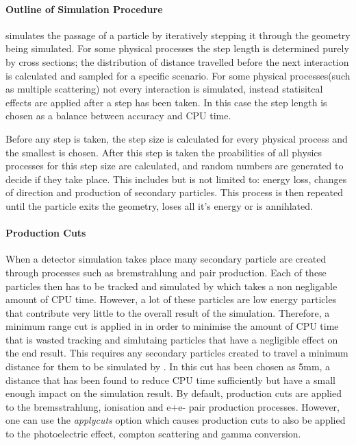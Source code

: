 \paragraph{Outline of \geant Simulation Procedure} \label{sec:steps}
\geant simulates the passage of a particle by iteratively stepping it through the geometry being simulated.  For some physical processes the step length is determined purely by cross sections; the distribution of distance travelled before the next interaction is calculated and sampled for a specific scenario.  For some physical processes(such as multiple scattering) not every interaction is simulated, instead statisitcal effects are applied after a step has been taken.  In this case the step length is chosen as a balance between accuracy and CPU time.

Before any step is taken, the step size is calculated for every physical process and the smallest is chosen.  After this step is taken the proabilities of all physics processes for this step size are calculated, and random numbers are generated to decide if they take place.  This includes but is not limited to: energy loss, changes of direction and production of secondary particles.  This process is then repeated until the particle exits the geometry, loses all it's energy or is annihlated.

\paragraph{Production Cuts}\label{sec:products}When a detector simulation takes place many secondary particle are created through processes such as bremstrahlung and pair production.  Each of these particles then has to be tracked and simulated by \geant which takes a non negligable amount of CPU time. However, a lot of these particles are low energy particles that contribute very little to the overall result of the simulation.  Therefore, a minimum range cut is applied in \geant in order to minimise the amount of CPU time that is wasted tracking and simlutaing particles that have a negligible effect on the end result.  This requires any secondary particles created to travel a minimum distance for them to be simulated by \geant.  In \lhcb this cut has been chosen as 5mm, a distance that has been found to reduce CPU time sufficiently but have a small enough impact on the simulation result. By default, production cuts are applied to the bremsstrahlung, ionisation and e+e- pair production processes.  However, one can use the \textit{applycuts} option which causes production cuts to also be applied to the photoelectric effect, compton scattering and gamma conversion.

